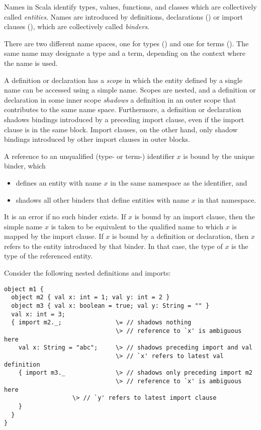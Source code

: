 \documentclass[11pt]{report}
\begin{document}
Names in Scala identify types, values, functions, and classes which
are collectively called {\em entities}.  Names are introduced by
definitions, declarations () or import clauses
(), which are collectively called {\em binders}.

There are two different name spaces, one for types ()
and one for terms ().  The same name may designate a
type and a term, depending on the context where the name is used.  

A definition or declaration has a {\em scope} in which the entity
defined by a single name can be accessed using a simple name. Scopes
are nested, and a definition or declaration in some inner scope {\em
shadows} a definition in an outer scope that contributes to the same
name space. Furthermore, a definition or declaration shadows bindings
introduced by a preceding import clause, even if the import clause is
in the same block. Import clauses, on the other hand, only shadow
bindings introduced by other import clauses in outer blocks.

A reference to an unqualified (type- or term-) identifier $x$ is bound
by the unique binder, which
\begin{itemize}
\item defines an entity with name $x$ in the same namespace as the
identifier, and
\item shadows all other binders that define entities with name $x$ in that namespace.
\end{itemize}
It is an error if no such binder exists.  If $x$ is bound by an import
clause, then the simple name $x$ is taken to be equivalent to the
qualified name to which $x$ is mapped by the import clause. If $x$ is bound by a definition or declaration,
then $x$ refers to the entity introduced by that
binder. In that case, the type of $x$ is the type of the referenced
entity.

\example Consider the following nested definitions and imports:

\begin{verbatim}
object m1 {
  object m2 { val x: int = 1; val y: int = 2 }
  object m3 { val x: boolean = true; val y: String = "" }
  val x: int = 3;              
  { import m2._;               \= // shadows nothing
                               \> // reference to `x' is ambiguous here
    val x: String = "abc";     \> // shadows preceding import and val
                               \> // `x' refers to latest val definition
    { import m3._              \> // shadows only preceding import m2
                               \> // reference to `x' is ambiguous here
			       \> // `y' refers to latest import clause
    }
  }
} 
\end{verbatim}
\end{document}

